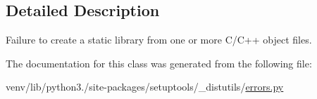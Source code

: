 \subsection{Detailed Description}
\begin{DoxyVerb}Failure to create a static library from one or more C/C++ object
files.\end{DoxyVerb}
 

The documentation for this class was generated from the following file\+:\begin{DoxyCompactItemize}
\item 
venv/lib/python3./site-\/packages/setuptools/\+\_\+distutils/\hyperlink{__distutils_2errors_8py}{errors.\+py}\end{DoxyCompactItemize}

